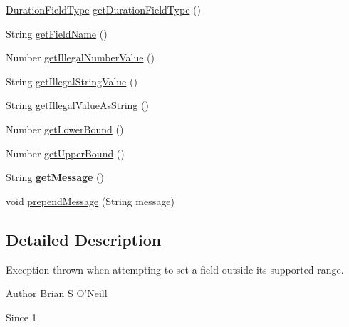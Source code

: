 \begin{DoxyCompactItemize}
\item 
\hyperlink{classorg_1_1joda_1_1time_1_1_duration_field_type}{Duration\-Field\-Type} \hyperlink{classorg_1_1joda_1_1time_1_1_illegal_field_value_exception_ada75848154a30f2c57548ab0c7347605}{get\-Duration\-Field\-Type} ()
\item 
String \hyperlink{classorg_1_1joda_1_1time_1_1_illegal_field_value_exception_a2aa5a052aec3effe3837f4ea767f55cd}{get\-Field\-Name} ()
\item 
Number \hyperlink{classorg_1_1joda_1_1time_1_1_illegal_field_value_exception_a622175e1a5c235ecedd63dc823ae2903}{get\-Illegal\-Number\-Value} ()
\item 
String \hyperlink{classorg_1_1joda_1_1time_1_1_illegal_field_value_exception_ab4478d8ce500710bd48d2cc2a4f0de92}{get\-Illegal\-String\-Value} ()
\item 
String \hyperlink{classorg_1_1joda_1_1time_1_1_illegal_field_value_exception_aa5666b2ae29875ef4e35d5edc9459a99}{get\-Illegal\-Value\-As\-String} ()
\item 
Number \hyperlink{classorg_1_1joda_1_1time_1_1_illegal_field_value_exception_a3084325230cb85392bd20328ddf7af1c}{get\-Lower\-Bound} ()
\item 
Number \hyperlink{classorg_1_1joda_1_1time_1_1_illegal_field_value_exception_a95000f8e1ad45c531fa73a886f2a4d1d}{get\-Upper\-Bound} ()
\item 
\hypertarget{classorg_1_1joda_1_1time_1_1_illegal_field_value_exception_aa187897244c17214d1ad0e32cb80218c}{String {\bfseries get\-Message} ()}\label{classorg_1_1joda_1_1time_1_1_illegal_field_value_exception_aa187897244c17214d1ad0e32cb80218c}

\item 
void \hyperlink{classorg_1_1joda_1_1time_1_1_illegal_field_value_exception_a70e21403c972f12c3347bb618d9e917b}{prepend\-Message} (String message)
\end{DoxyCompactItemize}


\subsection{Detailed Description}
Exception thrown when attempting to set a field outside its supported range.

\begin{DoxyAuthor}{Author}
Brian S O'Neill 
\end{DoxyAuthor}
\begin{DoxySince}{Since}
1. 
\end{DoxySince}


